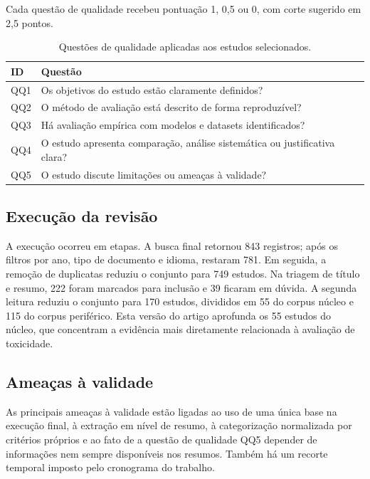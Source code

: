 \documentclass[12pt]{article}
\begin{document}
Cada questão de qualidade recebeu pontuação 1, 0,5 ou 0, com corte sugerido em 2,5 pontos.

\begin{table}[ht]
\centering
\small
\begin{tabular}{p{1.2cm}p{12.5cm}}
\hline
{\bfseries ID} & {\bfseries Questão} \\
\hline
QQ1 & Os objetivos do estudo estão claramente definidos? \\
QQ2 & O método de avaliação está descrito de forma reproduzível? \\
QQ3 & Há avaliação empírica com modelos e datasets identificados? \\
QQ4 & O estudo apresenta comparação, análise sistemática ou justificativa clara? \\
QQ5 & O estudo discute limitações ou ameaças à validade? \\
\hline
\end{tabular}
\caption{Questões de qualidade aplicadas aos estudos selecionados.}
\label{tab:qualidade}
\end{table}

\subsection{Execução da revisão}

A execução ocorreu em etapas. A busca final retornou 843 registros; após os filtros por ano, tipo de documento e idioma, restaram 781. Em seguida, a remoção de duplicatas reduziu o conjunto para 749 estudos. Na triagem de título e resumo, 222 foram marcados para inclusão e 39 ficaram em dúvida. A segunda leitura reduziu o conjunto para 170 estudos, divididos em 55 do corpus núcleo e 115 do corpus periférico. Esta versão do artigo aprofunda os 55 estudos do núcleo, que concentram a evidência mais diretamente relacionada à avaliação de toxicidade.

\subsection{Ameaças à validade}

As principais ameaças à validade estão ligadas ao uso de uma única base na execução final, à extração em nível de resumo, à categorização normalizada por critérios próprios e ao fato de a questão de qualidade QQ5 depender de informações nem sempre disponíveis nos resumos. Também há um recorte temporal imposto pelo cronograma do trabalho.
\end{document}
